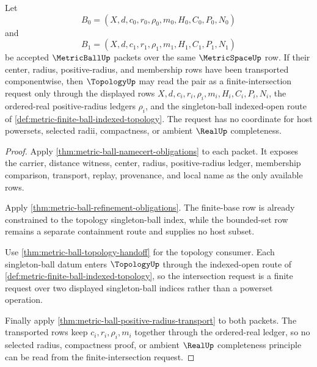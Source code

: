 \begin{theorem}
\label{thm:metric-ball-finite-intersection-readiness}
Let
$$
B_0=(X,d,c_0,r_0,\rho_0,m_0,H_0,C_0,P_0,N_0)
$$
and
$$
B_1=(X,d,c_1,r_1,\rho_1,m_1,H_1,C_1,P_1,N_1)
$$
be accepted $\MetricBallUp$ packets over the same $\MetricSpaceUp$ row. If their center, radius, positive-radius, and membership rows have been transported componentwise, then $\TopologyUp$ may read the pair as a finite-intersection request only through the displayed rows $X,d,c_i,r_i,\rho_i,m_i,H_i,C_i,P_i,N_i$, the ordered-real positive-radius ledgers $\rho_i$, and the singleton-ball indexed-open route of \autoref{def:metric-finite-ball-indexed-topology}. The request has no coordinate for host powersets, selected radii, compactness, or ambient $\RealUp$ completeness.
\end{theorem}
\begin{proof}
Apply \autoref{thm:metric-ball-namecert-obligations} to each packet. It exposes the carrier, distance witness, center, radius, positive-radius ledger, membership comparison, transport, replay, provenance, and local name as the only available rows.

Apply \autoref{thm:metric-ball-refinement-obligations}. The finite-base row is already constrained to the topology singleton-ball index, while the bounded-set row remains a separate containment route and supplies no host subset.

Use \autoref{thm:metric-ball-topology-handoff} for the topology consumer. Each singleton-ball datum enters $\TopologyUp$ through the indexed-open route of \autoref{def:metric-finite-ball-indexed-topology}, so the intersection request is a finite request over two displayed singleton-ball indices rather than a powerset operation.

Finally apply \autoref{thm:metric-ball-positive-radius-transport} to both packets. The transported rows keep $c_i,r_i,\rho_i,m_i$ together through the ordered-real ledger, so no selected radius, compactness proof, or ambient $\RealUp$ completeness principle can be read from the finite-intersection request.
\end{proof}

